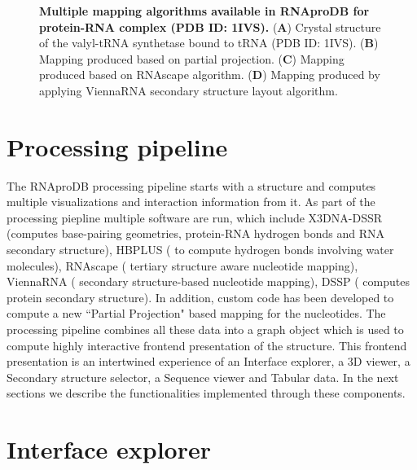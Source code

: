 \begin{center}
    \begin{figure}
        \caption[Multiple mapping algorithms available in RNAproDB for protein-RNA complex (PDB ID: 1IVS)]{\textbf{Multiple mapping algorithms available in RNAproDB for protein-RNA complex (PDB ID: 1IVS).} ({\bf A}) Crystal structure of the valyl-tRNA synthetase bound to tRNA (PDB ID: 1IVS).  ({\bf B})  Mapping produced based on partial projection. ({\bf C}) Mapping produced based on RNAscape algorithm. ({\bf D}) Mapping produced by applying ViennaRNA secondary structure layout algorithm. }
  \label{fig:rnaprodb1}
\end{figure}
\end{center}

\section{Processing pipeline}
The RNAproDB processing pipeline starts with a structure and computes multiple visualizations and interaction information from it. As part of the processing piepline multiple software are run, which include X3DNA-DSSR (\citep{Lu2015}computes base-pairing geometries, protein-RNA hydrogen bonds and RNA secondary structure), HBPLUS (\citep{McDonald1994} to compute hydrogen bonds involving water molecules), RNAscape (\citep{Mitra2024rnascape} tertiary structure aware nucleotide mapping), ViennaRNA (\citep{Lorenz2011} secondary structure-based nucleotide mapping), DSSP (\citep{joosten2010series, kabsch1983dictionary} computes protein secondary structure). In addition, custom code has been developed to compute a new ``Partial Projection" based mapping for the nucleotides. The processing pipeline combines all these data into a graph object which is used to compute highly interactive frontend presentation of the structure. This frontend presentation is an intertwined experience of an Interface explorer, a 3D viewer, a Secondary structure selector, a Sequence viewer and Tabular data. In the next sections we describe the functionalities implemented through these components.

\section{Interface explorer}

